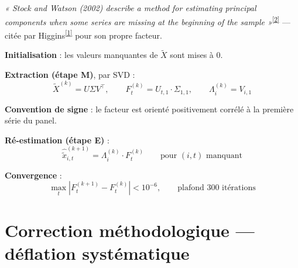 \documentclass[11pt,a4paper]{article}
\newcommand{\cit}[1]{\textsuperscript{\hyperlink{ref#1}{[#1]}}}
\begin{document}
\begin{definitionbox}
\textit{« Stock and Watson (2002) describe a method for estimating principal components when some series are missing at the beginning of the sample »}\cit{2} --- citée par Higgins\cit{1} pour son propre facteur.
\end{definitionbox}

\textbf{Initialisation} : les valeurs manquantes de $\tilde{X}$ sont mises à 0.

\textbf{Extraction (étape M)}, par SVD :
\begin{equation}
\tilde{X}^{(k)} = U\Sigma V^\top, \qquad F_t^{(k)} = U_{t,1}\cdot\Sigma_{1,1}, \qquad \Lambda_i^{(k)} = V_{i,1}
\label{eq:svd}
\end{equation}

\textbf{Convention de signe} : le facteur est orienté positivement corrélé à la première série du panel.

\textbf{Ré-estimation (étape E)} :
\begin{equation}
\hat{\tilde{x}}_{i,t}^{(k+1)} = \Lambda_i^{(k)} \cdot F_t^{(k)} \qquad \text{pour } (i,t) \text{ manquant}
\label{eq:reestimation}
\end{equation}

\textbf{Convergence} :
\begin{equation}
\max_t \left| F_t^{(k+1)} - F_t^{(k)} \right| < 10^{-6}, \qquad \text{plafond 300 itérations}
\label{eq:convergence}
\end{equation}

\section{Correction méthodologique --- déflation systématique}
\label{sec:correction_deflation}
\end{document}

